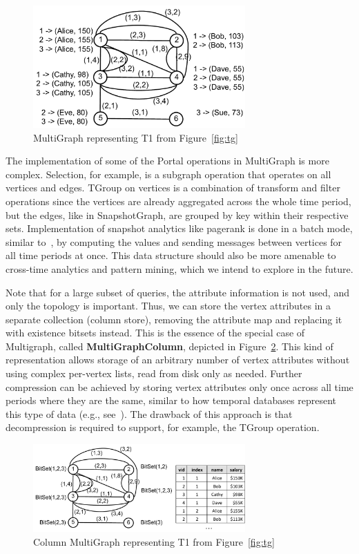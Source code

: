 \begin{figure}[t!]
\includegraphics[width=3.2in]{figs/mg.pdf}
\caption{MultiGraph representing T1 from Figure~\ref{fig:tg}}
\label{fig:mg}
\end{figure}

The implementation of some of the Portal operations in MultiGraph is
more complex.  Selection, for example, is a subgraph operation that
operates on all vertices and edges.  TGroup on vertices is a
combination of transform and filter operations since the vertices are
already aggregated across the whole time period, but the edges, like
in SnapshotGraph, are grouped by key within their respective sets.
Implementation of snapshot analytics like pagerank is done in a batch
mode, similar to~\cite{DBLP:journals/tos/MiaoHLWYZPCC15}, by computing
the values and sending messages between vertices for all time periods
at once.  This data structure should also be more amenable to
cross-time analytics and pattern mining, which we intend to explore in
the future.

Note that for a large subset of queries, the attribute information is
not used, and only the topology is important.  Thus, we can store the
vertex attributes in a separate collection (column store), removing
the attribute map and replacing it with existence bitsets instead.
This is the essence of the special case of Multigraph, called {\bf
  MultiGraphColumn}, depicted in Figure~\ref{fig:mgc}.  This kind of
representation allows storage of an arbitrary number of vertex
attributes without using complex per-vertex lists, read from disk only
as needed.  Further compression can be achieved by storing vertex
attributes only once across all time periods where they are the same,
similar to how temporal databases represent this type of data (e.g.,
see~\cite{Muller2008}).  The drawback of this approach is that
decompression is required to support, for example, the TGroup
operation.

\begin{figure}[t!]
\includegraphics[width=3.2in]{figs/mgc.pdf}
\caption{Column MultiGraph representing T1 from Figure~\ref{fig:tg}}
\label{fig:mgc}
\end{figure}


